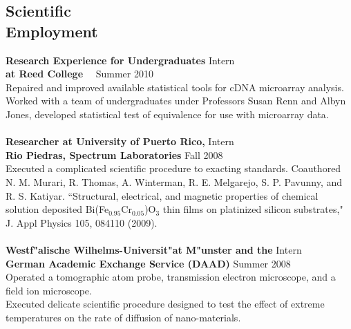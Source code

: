 \documentclass[margin,line]{resume}
\begin{document}
\begin{resume}
    \section{\mysidestyle Scientific\\Employment} 
\textbf{Research Experience for Undergraduates} \hfill  Intern \\ 
\textbf{at Reed College} \ \  \hfill Summer 2010 \\
Repaired and improved available statistical tools for cDNA microarray analysis. Worked with a team of undergraduates under Professors Susan Renn and Albyn Jones, developed statistical test of equivalence for use with microarray data. \\
\vspace{-2mm} \\
\textbf{Researcher at University of Puerto Rico,} \hfill  Intern\\
\textbf{Rio Piedras, Spectrum Laboratories} \hfill Fall 2008	\\
Executed a complicated scientific procedure to exacting standards. Coauthored N. M. Murari, R. Thomas, A. Winterman, R. E. Melgarejo, S. P. Pavunny, and R. S. Katiyar. ``Structural, electrical, and magnetic properties of chemical solution deposited Bi(Fe$_{0.95}$Cr$_{0.05}$)O$_3$ thin films on platinized silicon substrates," J. Appl Physics 105, 084110 (2009). 
\\\vspace{-2mm}\\
\textbf{Westf"alische Wilhelms-Universit"at M"unster and the} \hfill  Intern \\
\textbf{German Academic Exchange Service (DAAD)} \hfill Summer 2008	\\
Operated a tomographic atom probe, transmission electron microscope, and a field ion microscope. \\ Executed delicate scientific procedure designed to test the effect of extreme temperatures on the rate of diffusion of nano-materials.

\end{resume}
\end{document}
